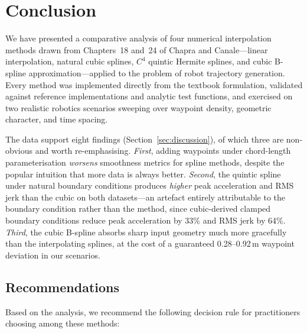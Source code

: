 \section{Conclusion}
\label{sec:conclusion}

We have presented a comparative analysis of four numerical
interpolation methods drawn from Chapters~18 and~24 of Chapra and
Canale---linear interpolation, natural cubic splines, $C^4$ quintic
Hermite splines, and cubic B-spline approximation---applied to the
problem of robot trajectory generation. Every method was implemented
directly from the textbook formulation, validated against reference
implementations and analytic test functions, and exercised on two
realistic robotics scenarios sweeping over waypoint density,
geometric character, and time spacing.

The data support eight findings (Section~\ref{sec:discussion}), of
which three are non-obvious and worth re-emphasising. \emph{First},
adding waypoints under chord-length parameterisation \emph{worsens}
smoothness metrics for spline methods, despite the popular intuition
that more data is always better. \emph{Second}, the quintic spline
under natural boundary conditions produces \emph{higher} peak
acceleration and RMS jerk than the cubic on both datasets---an
artefact entirely attributable to the boundary condition rather
than the method, since cubic-derived clamped boundary conditions
reduce peak acceleration by 33\% and RMS jerk by 64\%.
\emph{Third}, the cubic B-spline absorbs sharp input geometry much
more gracefully than the interpolating splines, at the cost of a
guaranteed 0.28--0.92\,m waypoint deviation in our scenarios.

\subsection{Recommendations}
\label{sec:recommendations}

Based on the analysis, we recommend the following decision rule for
practitioners choosing among these methods:

